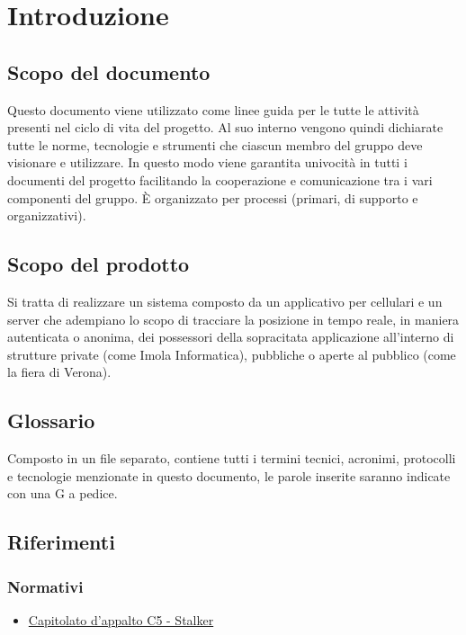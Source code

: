 \section{Introduzione}
\subsection{Scopo del documento}
Questo documento viene utilizzato come linee guida per le tutte le attività presenti nel ciclo di vita del progetto.
Al suo interno vengono quindi dichiarate tutte le norme, tecnologie e strumenti che ciascun membro del gruppo \Gruppo{} deve visionare e utilizzare.
In questo modo viene garantita univocità in tutti i documenti del progetto facilitando la cooperazione e comunicazione tra i vari componenti del gruppo.
È organizzato per processi (primari, di supporto e organizzativi).
	
\subsection{Scopo del prodotto}
Si tratta di realizzare un sistema composto da un applicativo per cellulari e un server che adempiano lo scopo di tracciare la posizione in tempo reale, in maniera autenticata o anonima, dei possessori della sopracitata applicazione all’interno di strutture private (come Imola Informatica),  pubbliche o aperte al pubblico (come la fiera di Verona).
	 
\subsection{Glossario}
Composto in un file separato, contiene tutti i termini tecnici, acronimi, protocolli e tecnologie menzionate in questo documento, le parole inserite saranno indicate con una G a pedice.
	
\subsection{Riferimenti} 
\subsubsection{Normativi}
\begin{itemize}
	\item \href{https://www.math.unipd.it/~tullio/IS-1/2019/Progetto/C5.pdf}{Capitolato d'appalto C5 - Stalker}
\end{itemize}

